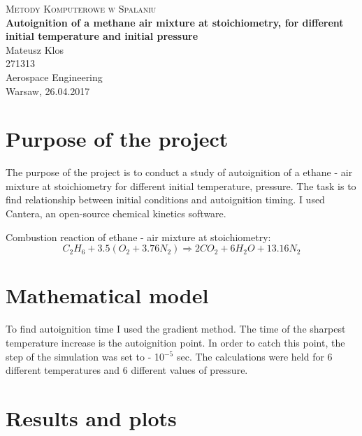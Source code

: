 \documentclass[11pt]{article}
\begin{document}
\begin{titlepage}

	\begin{center}

    


	\huge{\textsc{Metody Komputerowe w Spalaniu}} \\
[10mm]

    \LARGE{\textbf{Autoignition of a methane air mixture at stoichiometry, for different initial temperature and initial pressure
}} \\
	[50mm]
	\Large{Mateusz Klos}\\
    \Large{271313}\\
    [25mm]
    \large{Aerospace Engineering}\\
    [3mm]
    \large{Warsaw, 26.04.2017}\\
    \end{center}
    
\end{titlepage}

\newpage



\section{Purpose of the project}
The purpose of the project is to conduct a study of autoignition of a ethane - air mixture at stoichiometry for different initial temperature, pressure. The task is to find relationship between initial conditions and autoignition timing. I used Cantera, an open-source chemical kinetics software.


Combustion reaction of ethane - air mixture at stoichiometry:
\begin{displaymath}
C_{2}H_{6} + 3.5 (O_{2} + 3.76 N_{2}) \Rightarrow 2 CO_{2} + 6 H_{2}O + 13.16 N_{2}
\end{displaymath}

\section{Mathematical model}
To find autoignition time I used the gradient method. The time of the sharpest temperature increase is the autoignition point. In order to catch this point, the step of the simulation was set to - 10{$^{-5}$} sec. The calculations were held for 6 different temperatures and 6 different values of pressure. 

\section{Results and plots}
\end{document}
